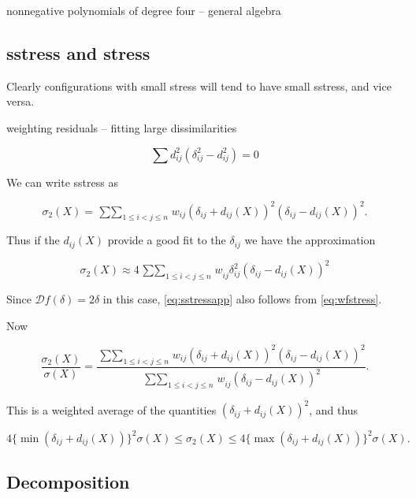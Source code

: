 \documentclass[
  12pt,
]{book}
\theoremstyle{definition}
\theoremstyle{definition}
\theoremstyle{definition}
\theoremstyle{definition}
\theoremstyle{remark}
\begin{document}
nonnegative polynomials of degree four -- general algebra

\hypertarget{sstress-and-stress}{%
\subsection{sstress and stress}\label{sstress-and-stress}}

Clearly configurations with small stress will tend to have small sstress, and vice versa.

weighting residuals -- fitting large dissimilarities

\[
\sum d_{ij}^2(\delta_{ij}^2-d_{ij}^2)=0
\]

We can write sstress as

\begin{equation}
\sigma_2(X)=\mathop{\sum\sum}_{1\leq i<j\leq n}w_{ij}(\delta_{ij}+d_{ij}(X))^2(\delta_{ij}-d_{ij}(X))^2.
\end{equation}

Thus if the \(d_{ij}(X)\) provide a good fit to the \(\delta_{ij}\)
we have the approximation

\begin{equation}
\sigma_2(X)\approx 4\mathop{\sum\sum}_{1\leq i<j\leq  n}w_{ij}^{\ }\delta_{ij}^2(\delta_{ij}-d_{ij}(X))^2
\label{eq:sstressapp}
\end{equation}

Since \(\mathcal{D}f(\delta)=2\delta\) in this case, \eqref{eq:sstressapp} also follows from
\eqref{eq:wfstress}.

Now

\begin{equation}
\frac{\sigma_2(X)}{\sigma(X)}=\frac{\mathop{\sum\sum}_{1\leq i<j\leq n}w_{ij}(\delta_{ij}+d_{ij}(X))^2(\delta_{ij}-d_{ij}(X))^2}{\mathop{\sum\sum}_{1\leq i<j\leq n}w_{ij}^{\ }(\delta_{ij}-d_{ij}(X))^2}.
\end{equation}

This is a weighted average of the quantities \((\delta_{ij}+d_{ij}(X))^2\), and thus

\begin{equation}
4\{\min(\delta_{ij}+d_{ij}(X))\}^2\sigma(X)\leq\sigma_2(X)\leq 4\{\max(\delta_{ij}+d_{ij}(X))\}^2\sigma(X).
\end{equation}

\hypertarget{decomposition}{%
\subsection{Decomposition}\label{decomposition}}
\end{document}
